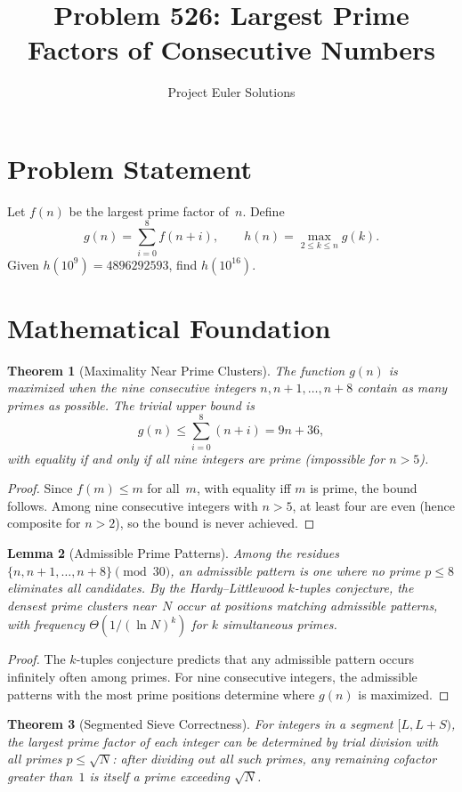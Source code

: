 \documentclass[11pt]{article}
\title{Problem 526: Largest Prime Factors of Consecutive Numbers}
\author{Project Euler Solutions}
\date{}
\newtheorem{theorem}{Theorem}
\newtheorem{lemma}[theorem]{Lemma}
\begin{document}
\maketitle

\section{Problem Statement}
Let $f(n)$ be the largest prime factor of~$n$. Define
\[
g(n) = \sum_{i=0}^{8} f(n+i), \qquad h(n) = \max_{2 \le k \le n} g(k).
\]
Given $h(10^9) = 4896292593$, find $h(10^{16})$.

\section{Mathematical Foundation}

\begin{theorem}[Maximality Near Prime Clusters]
The function $g(n)$ is maximized when the nine consecutive integers $n, n+1, \ldots, n+8$ contain as many primes as possible. The trivial upper bound is
\[
g(n) \le \sum_{i=0}^{8}(n+i) = 9n + 36,
\]
with equality if and only if all nine integers are prime (impossible for $n > 5$).
\end{theorem}

\begin{proof}
Since $f(m) \le m$ for all~$m$, with equality iff $m$ is prime, the bound follows. Among nine consecutive integers with $n > 5$, at least four are even (hence composite for $n > 2$), so the bound is never achieved.
\end{proof}

\begin{lemma}[Admissible Prime Patterns]
Among the residues $\{n, n+1, \ldots, n+8\} \pmod{30}$, an admissible pattern is one where no prime $p \le 8$ eliminates all candidates. By the Hardy--Littlewood $k$-tuples conjecture, the densest prime clusters near~$N$ occur at positions matching admissible patterns, with frequency $\Theta(1/(\ln N)^k)$ for $k$ simultaneous primes.
\end{lemma}

\begin{proof}
The $k$-tuples conjecture predicts that any admissible pattern occurs infinitely often among primes. For nine consecutive integers, the admissible patterns with the most prime positions determine where $g(n)$ is maximized.
\end{proof}

\begin{theorem}[Segmented Sieve Correctness]
For integers in a segment $[L, L+S)$, the largest prime factor of each integer can be determined by trial division with all primes $p \le \sqrt{N}$: after dividing out all such primes, any remaining cofactor greater than~$1$ is itself a prime exceeding $\sqrt{N}$.
\end{theorem}
\end{document}
